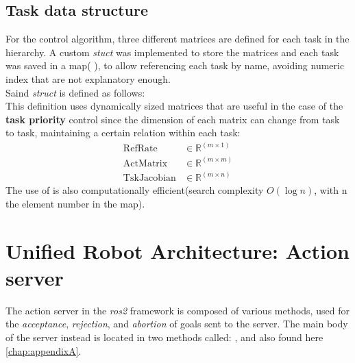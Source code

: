 \subsection{Task data structure}
For the control algorithm, three different matrices are defined for each task in the hierarchy. A custom \textit{stuct} was implemented to store the matrices and each task was saved in a map( ), to allow referencing each task by name, avoiding numeric index that are not explanatory enough.\\[6pt]
\noindent Saind \textit{struct} is defined as follows:
\\[6pt]
\noindent{}
\noindent This definition uses dynamically sized matrices that are useful in the case of the \textbf{task priority} control since the dimension of each matrix can change from task to task, maintaining a certain relation within each task:
\begin{equation}
	\begin{aligned}
		\mathrm{RefRate}     &\in \mathbb{R}^{(m\times1)} \\
		\mathrm{ActMatrix}   &\in \mathbb{R}^{(m\times m)} \\
		\mathrm{TskJacobian} &\in \mathbb{R}^{(m\times n)}
	\end{aligned}
\end{equation}
\noindent The use of  is also computationally efficient(search complexity $O(\log n)$, with n the element number in the map).


\section{Unified Robot Architecture: Action server}
The action server in the \textit{ros2} framework is composed of various methods, used for the \textit{acceptance}, \textit{rejection}, and \textit{abortion} of goals sent to the server. The main body of the server instead is located in two methods called: , and  also found here \ref{chap:appendixA}.

